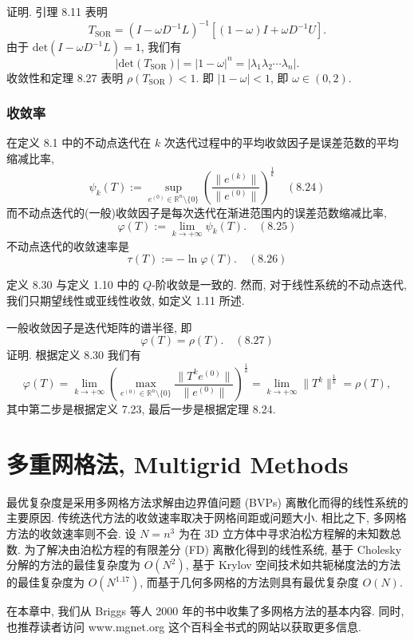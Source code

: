 \documentclass[a4paper]{ctexart}
\newcommand{\hl}[1]
{\noindent {\bf {#1}}}
\begin{document}
{证明. 引理 8.11 表明
$$ 
T_{\text{SOR}} = (I - \omega D^{-1}L)^{-1}[(1 - \omega)I + \omega D^{-1}U]. 
$$
由于 $\text{det}(I - \omega D^{-1}L) = 1$, 
我们有
$$ 
|\text{det}(T_{\text{SOR}})| = |1 - \omega|^n 
= |\lambda_1\lambda_2 \cdots \lambda_n|. 
$$
收敛性和定理 8.27 表明 $\rho(T_{\text{SOR}}) < 1$.
即 $|1 - \omega| < 1$, 即
$\omega \in (0, 2)$.

\subsubsection{收敛率}

\hl{定义 8.30} 在定义 8.1 中的不动点迭代在 $k$ 
次迭代过程中的平均收敛因子是误差范数的平均缩减比率, 
$$
\psi_k(T) := \sup_{e^{(0)} \in \mathbb{R}^n \setminus \{0\}} 
\left( \frac{\|e^{(k)}\|}{\|e^{(0)}\|} \right)^{\frac{1}{k}} \quad (8.24) 
$$
而不动点迭代的(一般)收敛因子是每次迭代在渐进范围内的误差范数缩减比率,
$$ 
\varphi(T) := \lim_{k \to +\infty} \psi_k(T). \quad (8.25) 
$$
不动点迭代的收敛速率是
$$
\tau(T) := -\ln \varphi(T). \quad (8.26) 
$$

定义 8.30 与定义 1.10 中的 $Q$-阶收敛是一致的. 
然而, 对于线性系统的不动点迭代, 我们只期望线性或亚线性收敛, 如定义 1.11 所述.

\hl{定理 8.31} 一般收敛因子是迭代矩阵的谱半径, 即
$$ 
\varphi(T) = \rho(T). \quad (8.27) 
$$
证明. 根据定义 8.30 我们有
$$ 
\varphi(T) = \lim_{k \to +\infty} 
\left( \max_{e^{(0)} \in \mathbb{R}^n \setminus \{0\}} 
\frac{\|T^k e^{(0)}\|}{\|e^{(0)}\|} \right)^{\frac{1}{k}} 
= \lim_{k \to +\infty} \|T^k\|^{\frac{1}{k}} = \rho(T), 
$$
其中第二步是根据定义 7.23, 最后一步是根据定理 8.24.


\section{多重网格法, Multigrid Methods}

最优复杂度是采用多网格方法求解由边界值问题 (BVPs) 离散化而得的线性系统的主要原因. 
传统迭代方法的收敛速率取决于网格间距或问题大小. 相比之下, 多网格方法的收敛速率则不会. 
设 $N = n^3$ 为在 3D 立方体中寻求泊松方程解的未知数总数. 
为了解决由泊松方程的有限差分 (FD) 离散化得到的线性系统, 
基于 Cholesky 分解的方法的最佳复杂度为 $O(N^2)$, 
基于 Krylov 空间技术如共轭梯度法的方法的最佳复杂度为 $O(N^{1.17})$, 
而基于几何多网格的方法则具有最优复杂度 $O(N)$.

在本章中, 我们从 Briggs 等人 2000 年的书中收集了多网格方法的基本内容. 
同时, 也推荐读者访问 www.mgnet.org 这个百科全书式的网站以获取更多信息. 

}
\end{document}
